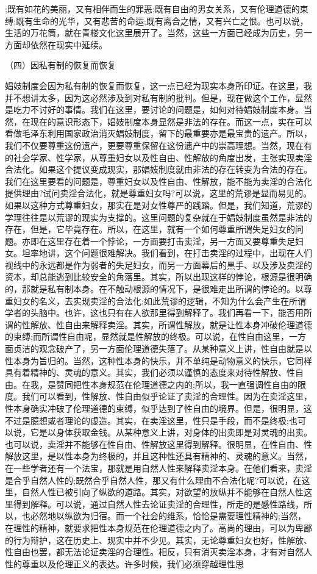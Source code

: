 \documentclass[
    a4paper
    ]{article}
\begin{document}
;既有如花的美丽，又有相伴而生的罪恶;既有自由的男女关系，又有伦理道德的束缚;既有生命的光华，又有悲苦的命运;既有离合之情，又有兴亡之恨。也可以说，生活的万花筒，就在青楼文化这里展开了。当然，这些一方面已经成为历史，另一方面却依然在现实中延续。　

（四）因私有制的恢复而恢复

娼妓制度会因为私有制的恢复而恢复，这一点已经为现实本身所印证。在这里，我并不想讲太多，因为这必然涉及到对私有制的批判。但是，现在做这个工作，显然是吃力不讨好的事情。我们在这里，要讨论的问题是，如何对待娼妓制度本身。当然，在现在的意识形态下，娼妓制度本身显然是非法的存在。而这一点，实在可以看做毛泽东利用国家政治消灭娼妓制度，留下的最重要亦是最宝贵的遗产。所以，我们不仅要尊重这份遗产，更要尊重保留在这份遗产中的崇高理想。当然，现在有的社会学家、性学家，从尊重妇女以及性自由、性解放的角度出发，主张实现卖淫合法化。如果这个提议变成现实，那娼妓制度就由非法的存在转变为合法的存在。我们在这里要看的问题是，尊重妇女以及性自由、性解放，能不能为卖淫的合法化提供理由?试问卖淫合法化，就是尊重妇女吗?可以说，这里的荒谬是显而易见的。如果以这种方式尊重妇女，那实在是对女性尊严的践踏。但是，我们知道，荒谬的学理往往是以荒谬的现实为支撑的。这里问题的复杂就在于娼妓制度虽然是非法的存在，但是，它毕竟存在。所以，在这里，就有一个如何尊重所谓失足妇女的问题。亦即在这里存在着一个悖论，一方面要打击卖淫，另一方面又要尊重失足妇女。坦率地讲，这个问题很难解决。我们看到，在打击卖淫的过程中，出现在人们视线中的永远都是作为弱者的失足妇女，而另一方面幕后的黑手、以及涉及卖淫的资本，却总能逃到比较安全的角落里。其实，所以出现这样的悖论，根源是很明确的，那就是私有制本身。在不触动根源的情况下，是很难走出所谓的悖论的。以尊重妇女的名义，去实现卖淫的合法化;如此荒谬的逻辑，不知为什么会产生在所谓学者的头脑中。也许，这也只有在人欲那里得到解释了。我们再看一下，能否用所谓的性解放、性自由来解释卖淫。其实，所谓性解放，就是让性本身冲破伦理道德的束缚;而所谓性自由呢，显然就是性解放的终极。可以说，在性自由这里，一方面贞洁的观念破产了，另一方面伦理道德失落了。从某种意义上讲，性自由就是以性本身为旨归的。当然，这种性本身的快乐，并不单纯是动物意义的快乐，它同样具有着精神的、灵魂的意义。其实，我们必须以谨慎的态度来对待性解放、性自由。在我，是赞同把性本身规范在伦理道德之内的;所以，我一直强调性自由的限度。我们可以看到，性解放、性自由似乎论证了卖淫的合理性。因为在卖淫这里，性本身确实冲破了伦理道德的束缚，似乎达到了性自由的境界。但是，很明显，这不过是臆想或者理论的虚造。其实，在卖淫这里，性只是手段，而不是终极;也可以说，它是以身体获取金钱。从某种意义上讲，对身体的出卖即是对灵魂的出卖。也可以说，卖淫并不能够在性自由、性解放这里得到解释。很明显，在性自由、性解放这里，是以性本身为终极的，并且这种性还具有精神的、灵魂的意义。当然，在一些学者还有一个法宝，那就是用自然人性来解释卖淫本身。在他们看来，卖淫是合乎自然人性的;既然合乎自然人性，那又有什么理由不合法化呢?可以说，在这里，自然人性已被引向了纵欲的道路。其实，对欲望的放纵并不能够在自然人性这里得到解释。可以说，通过自然人性去论证卖淫的合理性，所走的是感性路线，所以，也必然地以纵欲为归宿。而一个社会的维系，恰恰是需要理性精神的;当然，在理性的精神，就要求把性本身规范在伦理道德之内了。高尚的理由，可以为卑鄙的行为辩护，这在历史上、现实中并不少见。其实，无论尊重妇女也好，性解放、性自由也罢，都无法论证卖淫的合理性。相反，只有消灭卖淫本身，才有对自然人性的尊重以及伦理正义的表达。许多时候，我们必须穿越理性思
\end{document}
